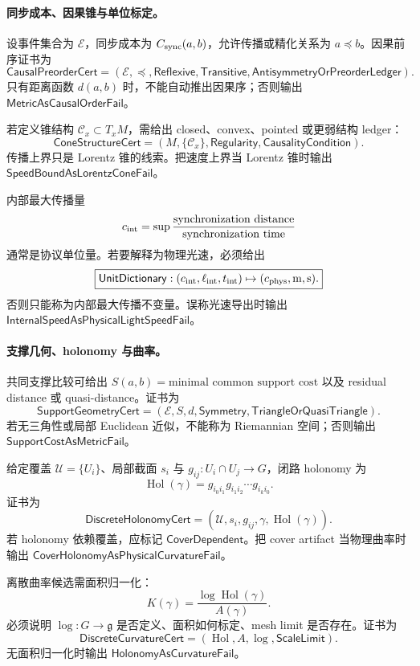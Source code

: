 \paragraph{同步成本、因果锥与单位标定。}
设事件集合为 \(\mathcal E\)，同步成本为 \(C_{\rm sync}(a,b)\)，允许传播或精化关系为 \(a\preceq b\)。因果前序证书为
\[
\boxed{\mathsf{CausalPreorderCert}=(\mathcal E,\preceq,\mathsf{Reflexive},\mathsf{Transitive},\mathsf{AntisymmetryOrPreorderLedger}).}
\]
只有距离函数 \(d(a,b)\) 时，不能自动推出因果序；否则输出 \(\mathsf{MetricAsCausalOrderFail}\)。

若定义锥结构 \(\mathcal C_x\subset T_xM\)，需给出 closed、convex、pointed 或更弱结构 ledger：
\[
\boxed{\mathsf{ConeStructureCert}=(M,\{\mathcal C_x\},\mathsf{Regularity},\mathsf{CausalityCondition}).}
\]
传播上界只是 Lorentz 锥的线索。把速度上界当 Lorentz 锥时输出 \(\mathsf{SpeedBoundAsLorentzConeFail}\)。

内部最大传播量
\[
c_{\rm int}=\sup\frac{\text{synchronization distance}}{\text{synchronization time}}
\]
通常是协议单位量。若要解释为物理光速，必须给出
\[
\boxed{\mathsf{UnitDictionary}:(c_{\rm int},\ell_{\rm int},t_{\rm int})\mapsto(c_{\rm phys},{\rm m},{\rm s}).}
\]
否则只能称为内部最大传播不变量。误称光速导出时输出 \(\mathsf{InternalSpeedAsPhysicalLightSpeedFail}\)。

\paragraph{支撑几何、holonomy 与曲率。}
共同支撑比较可给出 \(S(a,b)=\text{minimal common support cost}\) 以及 residual distance 或 quasi-distance。证书为
\[
\boxed{\mathsf{SupportGeometryCert}=(\mathcal E,S,d,\mathsf{Symmetry},\mathsf{TriangleOrQuasiTriangle}).}
\]
若无三角性或局部 Euclidean 近似，不能称为 Riemannian 空间；否则输出 \(\mathsf{SupportCostAsMetricFail}\)。

给定覆盖 \(\mathcal U=\{U_i\}\)、局部截面 \(s_i\) 与 \(g_{ij}:U_i\cap U_j\to G\)，闭路 holonomy 为
\[
\operatorname{Hol}(\gamma)=g_{i_0i_1}g_{i_1i_2}\cdots g_{i_ki_0}.
\]
证书为
\[
\boxed{\mathsf{DiscreteHolonomyCert}=(\mathcal U,s_i,g_{ij},\gamma,\operatorname{Hol}(\gamma)).}
\]
若 holonomy 依赖覆盖，应标记 \(\mathsf{CoverDependent}\)。把 cover artifact 当物理曲率时输出 \(\mathsf{CoverHolonomyAsPhysicalCurvatureFail}\)。

离散曲率候选需面积归一化：
\[
K(\gamma)=\frac{\log\operatorname{Hol}(\gamma)}{A(\gamma)}.
\]
必须说明 \(\log:G\to\mathfrak g\) 是否定义、面积如何标定、mesh limit 是否存在。证书为
\[
\boxed{\mathsf{DiscreteCurvatureCert}=(\operatorname{Hol},A,\log,\mathsf{ScaleLimit}).}
\]
无面积归一化时输出 \(\mathsf{HolonomyAsCurvatureFail}\)。

